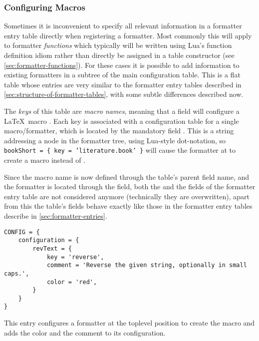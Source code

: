\documentclass{scrartcl}
\begin{document}
\subsubsection{Configuring Macros}
\label{sec:configuring-macros}

Sometimes it is inconvenient to specify all relevant information in a formatter
entry table directly when registering a formatter.  Most commonly this will
apply to formatter \emph{functions} which typically will be written using Lua's
function definition idiom rather than directly be assigned in a table
constructor (see \vref{sec:formatter-functions}).  For these cases it is
possible to add information to existing formatters in a 
subtree of the main configuration table.  This is a flat table whose entries are
very similar to the formatter entry tables described in
\vref{sec:structure-of-formatter-tables}, with some subtle differences described
now.

The \emph{keys} of this table are \emph{macro names}, meaning that a field
 will configure a \LaTeX\ macro
.
Each key is associated with a configuration table for a single macro/formatter,
which is located by the mandatory field .  This is a string
addressing a node in the formatter tree, using Lua-style dot-notation, so
\texttt{bookShort = \{ key = 'literature.book' \}} will cause the formatter at
 to create a macro  instead of
.

Since the macro name is now defined through the table's parent field name, and
the formatter is located through the  field, both the  and
the  fields of the formatter entry table are not considered anymore
(technically they are overwritten), apart from this the table's fields  behave
exactly like those in the formatter entry tables describe in
\vref{sec:formatter-entries}.

\begin{verbatim}
CONFIG = {
    configuration = {
        revText = {
            key = 'reverse',
            comment = 'Reverse the given string, optionally in small caps.',
            color = 'red',
        }
    }
}
\end{verbatim}

\noindent
This entry configures a formatter at the toplevel position  to
create the macro  and adds the color and the comment to its
configuration.
\end{document}
